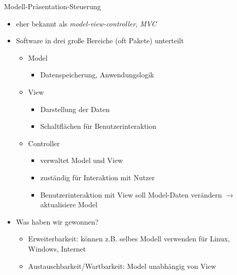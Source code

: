 \documentclass[18pt]{beamer}
\begin{document}
\begin{frame}{Modell-Präsentation-Steuerung}
	\begin{itemize}
		\item eher bekannt als \emph{model-view-controller}, \emph{MVC}
		\item Software in drei große Bereiche (oft Pakete) unterteilt
		\begin{itemize}
			\item Model
			\begin{itemize}
				\item Datenspeicherung, Anwendungslogik
			\end{itemize}
			\item View
			\begin{itemize}
				\item Darstellung der Daten
				\item Schaltflächen für Benutzerinteraktion
			\end{itemize}
			\item Controller
			\begin{itemize}
				\item verwaltet Model und View
				\item zuständig für Interaktion mit Nutzer
				\item Benutzerinteraktion mit View soll Model-Daten verändern \newline $\rightarrow$ aktualisiere Model
			\end{itemize}
		\end{itemize}
	\pause
		\item Was haben wir gewonnen?
		\begin{itemize}
			\item Erweiterbarkeit: können z.B. selbes Modell verwenden für Linux, Windows, Internet
			\item Austauschbarkeit/Wartbarkeit: Model unabhängig von View
		\end{itemize}
	\end{itemize}
\end{frame}
\end{document}
